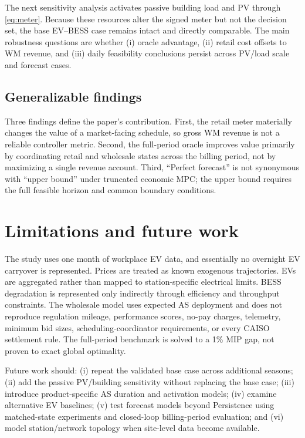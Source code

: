 \documentclass[final,5p,times]{elsarticle}
\begin{document}
The next sensitivity analysis activates passive building load and PV through
\eqref{eq:meter}. Because these resources alter the signed meter but not the
decision set, the base EV--BESS case remains intact and directly comparable.
The main robustness questions are whether (i) oracle advantage, (ii) retail cost
offsets to WM revenue, and (iii) daily feasibility conclusions persist across
PV/load scale and forecast cases.

\subsection{Generalizable findings}
Three findings define the paper's contribution. First, the retail meter materially
changes the value of a market-facing schedule, so gross WM revenue is not a
reliable controller metric. Second, the full-period oracle improves value
primarily by coordinating retail and wholesale states across the billing
period, not by maximizing a single revenue account. Third, ``Perfect forecast''
is not synonymous with ``upper bound'' under truncated economic MPC; the upper
bound requires the full feasible horizon and common boundary conditions.

\section{Limitations and future work}
\label{sec:limitations}

The study uses one month of workplace EV data, and essentially no overnight EV
carryover is represented. Prices are treated as known exogenous trajectories.
EVs are aggregated rather than mapped to station-specific electrical limits.
BESS degradation is represented only indirectly through efficiency and
throughput constraints. The wholesale model uses expected AS deployment and
does not reproduce regulation mileage, performance scores, no-pay charges,
telemetry, minimum bid sizes, scheduling-coordinator requirements, or every
CAISO settlement rule. The full-period benchmark is solved to a 1\% MIP gap,
not proven to exact global optimality.

Future work should: (i) repeat the validated base case across additional
seasons; (ii) add the passive PV/building sensitivity without replacing the
base case; (iii) introduce product-specific AS duration and activation models;
(iv) examine alternative EV baselines; (v) test forecast models beyond
Persistence using matched-state experiments and closed-loop billing-period
evaluation; and (vi) model station/network topology when site-level data become
available.
\end{document}

